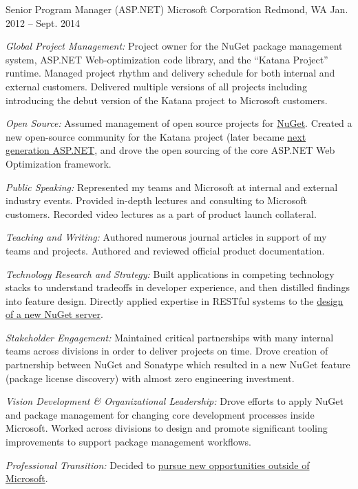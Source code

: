 \begin{cventries}
\cventry 
{Senior Program Manager (ASP.NET)}
{Microsoft Corporation}
{Redmond, WA}
{Jan. 2012 – Sept. 2014}
{ %
\begin{cvitems}
\item {\emph{Global Project Management:} Project owner for the NuGet package management system, ASP.NET Web-optimization code library, and the “Katana Project” runtime. Managed project rhythm and delivery schedule for both internal and external customers. Delivered multiple versions of all projects including introducing the debut version of the Katana project to Microsoft customers.}
\item {\emph{Open Source:}  Assumed management of open source projects for \href{https://github.com/NuGet}{NuGet}. Created a new open-source community for the Katana project (later became \href{https://github.com/aspnet/GetStarted}{next generation ASP.NET}, and drove the open sourcing of the core ASP.NET Web Optimization framework.}
\item {\emph{Public Speaking:} Represented my teams and Microsoft at internal and external industry events. Provided in-depth lectures and consulting to Microsoft customers. Recorded video lectures as a part of product launch collateral.}
\item {\emph{Teaching and Writing:} Authored numerous journal articles in support of my teams and projects. Authored and reviewed official product documentation.}
\item {\emph{Technology Research and Strategy:} Built applications in competing technology stacks to understand tradeoffs in developer experience, and then distilled findings into feature design. Directly applied expertise in RESTful systems to the \href{https://docs.nuget.org/ndocs/api/nuget-api-v3}{design of a new NuGet server}.}
\item {\emph{Stakeholder Engagement:} Maintained critical partnerships with many internal teams across divisions in order to deliver projects on time. Drove creation of partnership between NuGet and Sonatype which resulted in a new NuGet feature (package license discovery) with almost zero engineering investment.}
\item {\emph{Vision Development \& Organizational Leadership:} Drove efforts to apply NuGet and package management for changing core development processes inside Microsoft. Worked across divisions to design and promote significant tooling improvements to support package management workflows.}
\item {\emph{Professional Transition:} Decided to \href{https://www.howarddierking.com/2014/08/14/leaving-microsoft/}{pursue new opportunities outside of Microsoft}.}
\end{cvitems}
}


\end{cventries}
